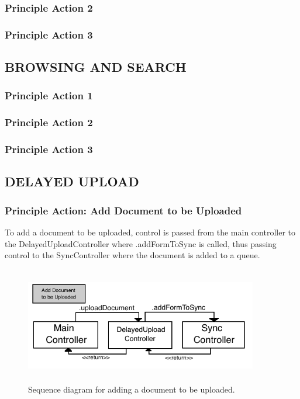 \documentclass[twoside,letterpaper]{article}
\begin{document}
{\subsubsection{Principle Action 2}
\subsubsection{Principle Action 3}

\subsection[BROWSING AND SEARCH]{\rmfamily\bfseries\color{black}
BROWSING AND SEARCH}
\subsubsection{Principle Action 1}
\subsubsection{Principle Action 2}
\subsubsection{Principle Action 3}

\subsection[DELAYED UPLOAD]{\rmfamily\bfseries\color{black}
DELAYED UPLOAD}
\subsubsection{Principle Action: Add Document to be Uploaded}
To add a document to be uploaded, control is passed from the main controller to the DelayedUploadController where .addFormToSync is called, thus passing control to the SyncController where the document is added to a queue.
\begin{figure}[H]
\centering
\includegraphics[width=4in,height=2in]{Add.jpg}
\caption{Sequence diagram for adding a document to be uploaded.}
\end{figure}
}
\end{document}
